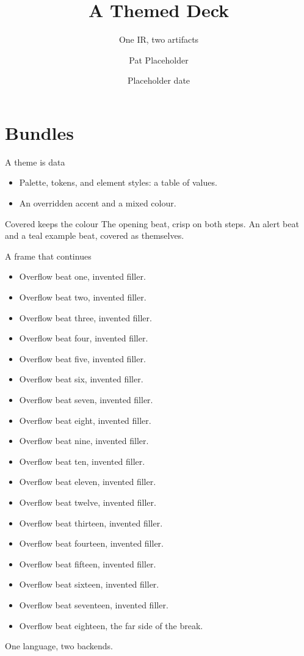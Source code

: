 \documentclass[aspectratio=169]{beamer}
\title{A Themed Deck}
\subtitle{One IR, two artifacts}
\author{Pat Placeholder}
\institute{example.org}
\date{Placeholder date}
\begin{document}
\maketitle

\section{Bundles}

\begin{frame}{A theme is data}
  \begin{itemize}
    \item Palette, tokens, and element styles: a table of values.
    \item \alert{An overridden accent} and \textcolor{fg!50!bg}{a mixed colour}.
  \end{itemize}
\end{frame}

\begin{frame}{Covered keeps the colour}
  The opening beat, crisp on both steps.
  \pause
  An \alert{alert beat} and a \textcolor{example}{teal example beat},
  covered as themselves.
\end{frame}

\begin{frame}[allowframebreaks]{A frame that continues}
  \begin{itemize}
    \item Overflow beat one, invented filler.
    \item Overflow beat two, invented filler.
    \item Overflow beat three, invented filler.
    \item Overflow beat four, invented filler.
    \item Overflow beat five, invented filler.
    \item Overflow beat six, invented filler.
    \item Overflow beat seven, invented filler.
    \item Overflow beat eight, invented filler.
    \item Overflow beat nine, invented filler.
    \item Overflow beat ten, invented filler.
    \item Overflow beat eleven, invented filler.
    \item Overflow beat twelve, invented filler.
    \item Overflow beat thirteen, invented filler.
    \item Overflow beat fourteen, invented filler.
    \item Overflow beat fifteen, invented filler.
    \item Overflow beat sixteen, invented filler.
    \item Overflow beat seventeen, invented filler.
    \item Overflow beat eighteen, the far side of the break.
  \end{itemize}
\end{frame}

\begin{frame}[standout]
  One language, two backends.
\end{frame}
\end{document}
